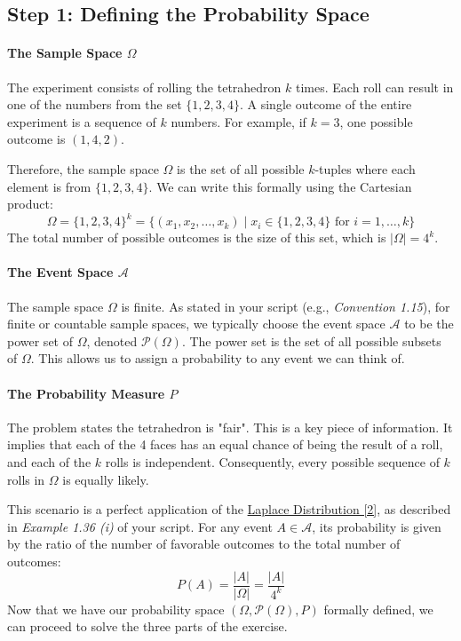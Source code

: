 \documentclass[11pt,a4paper]{article}
\begin{document}
\subsection{Step 1: Defining the Probability Space}

\paragraph{The Sample Space $\Omega$}
The experiment consists of rolling the tetrahedron $k$ times. Each roll can result in one of the numbers from the set $\{1, 2, 3, 4\}$. A single outcome of the entire experiment is a sequence of $k$ numbers. For example, if $k=3$, one possible outcome is $(1, 4, 2)$.

Therefore, the sample space $\Omega$ is the set of all possible $k$-tuples where each element is from $\{1, 2, 3, 4\}$. We can write this formally using the Cartesian product:
\[
\Omega = \{1, 2, 3, 4\}^k = \{ (x_1, x_2, \dots, x_k) \mid x_i \in \{1, 2, 3, 4\} \text{ for } i=1, \dots, k \}
\]
The total number of possible outcomes is the size of this set, which is $|\Omega| = 4^k$.

\paragraph{The Event Space $\mathcal{A}$}
The sample space $\Omega$ is finite. As stated in your script (e.g., \textit{Convention 1.15}), for finite or countable sample spaces, we typically choose the event space $\mathcal{A}$ to be the power set of $\Omega$, denoted $\mathcal{P}(\Omega)$. The power set is the set of all possible subsets of $\Omega$. This allows us to assign a probability to any event we can think of.

\paragraph{The Probability Measure $P$}
The problem states the tetrahedron is "fair". This is a key piece of information. It implies that each of the 4 faces has an equal chance of being the result of a roll, and each of the $k$ rolls is independent. Consequently, every possible sequence of $k$ rolls in $\Omega$ is equally likely.

This scenario is a perfect application of the \hyperlink{concept:laplace}{Laplace Distribution [2]}, as described in \textit{Example 1.36 (i)} of your script. For any event $A \in \mathcal{A}$, its probability is given by the ratio of the number of favorable outcomes to the total number of outcomes:
\[
P(A) = \frac{|A|}{|\Omega|} = \frac{|A|}{4^k}
\]
Now that we have our probability space $(\Omega, \mathcal{P}(\Omega), P)$ formally defined, we can proceed to solve the three parts of the exercise.
\end{document}
